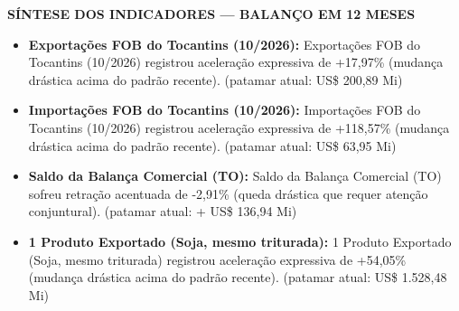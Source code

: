 \documentclass[10pt,a4paper]{article}
\begin{document}
{\hfill%
%
}

\vspace{0.03cm}
\par\vspace{0.05cm}
\par\vspace{4pt}
{\fontsize{7.8}{9.4}\selectfont\bfseries\color{corprimaria}\MakeUppercase{Síntese dos Indicadores — Balanço em 12 Meses}}\par\vspace{2pt}
{\scriptsize\color{cinzatexto}
\begin{itemize}[leftmargin=10pt, itemsep=1.2pt, topsep=1pt, parsep=0pt]
   \item \textbf{\color{corprimaria}Exportações FOB do Tocantins (10/2026):} Exportações FOB do Tocantins (10/2026) registrou aceleração expressiva de +17,97\% (mudança drástica acima do padrão recente). (patamar atual: US\$ 200,89 Mi)
   \item \textbf{\color{corprimaria}Importações FOB do Tocantins (10/2026):} Importações FOB do Tocantins (10/2026) registrou aceleração expressiva de +118,57\% (mudança drástica acima do padrão recente). (patamar atual: US\$ 63,95 Mi)
   \item \textbf{\color{corprimaria}Saldo da Balança Comercial (TO):} Saldo da Balança Comercial (TO) sofreu retração acentuada de -2,91\% (queda drástica que requer atenção conjuntural). (patamar atual: + US\$ 136,94 Mi)
   \item \textbf{\color{corprimaria}1\textordmasculine{} Produto Exportado (Soja, mesmo triturada):} 1\textordmasculine{} Produto Exportado (Soja, mesmo triturada) registrou aceleração expressiva de +54,05\% (mudança drástica acima do padrão recente). (patamar atual: US\$ 1.528,48 Mi)
\end{itemize}
}
\par\vspace{0.05cm}
\end{document}
